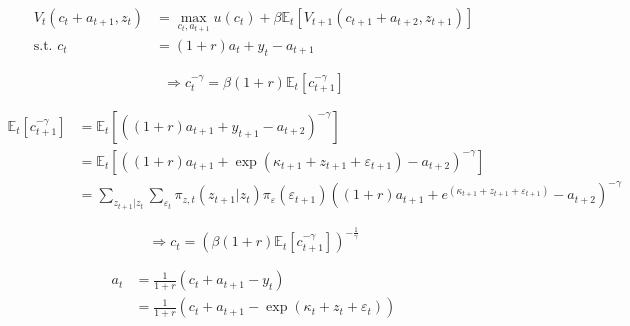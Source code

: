 \documentclass[11pt]{article}
\begin{document}
\begin{equation*}
\begin{split}
 V_{t}(c_t + a_{t+1}, z_t) &= \max_{c_t,a_{t+1}} u(c_{t}) + \beta \mathbb{E}_t[V_{t+1}(c_{t+1} + a_{t+2}, z_{t+1})] \\
 \text{s.t. } c_t &= (1+r) a_{t}+y_t - a_{t+1}
\end{split}
\end{equation*}

$$ \Rightarrow c_t^{-\gamma} = \beta (1+r) \mathbb{E}_t [c_{t+1}^{-\gamma}] $$

\begin{equation}
\begin{split}
\mathbb{E}_t [c_{t+1}^{-\gamma}] &=
      \mathbb{E}_t [\left( (1+r)a_{t+1} + y_{t+1} - a_{t+2} \right)^{-\gamma}] \\
      &= \mathbb{E}_t [\left((1+r)a_{t+1} + \exp(\kappa_{t+1} + z_{t+1} + \varepsilon_{t+1}) - a_{t+2} \right)^{-\gamma}] \\
      &= \sum_{z_{t+1}|z_t} \sum_{\varepsilon_t} \pi_{z,t}(z_{t+1}|z_t) \pi_\varepsilon(\varepsilon_{t+1}) \left((1+r)a_{t+1} + e^{(\kappa_{t+1} + z_{t+1} + \varepsilon_{t+1})} - a_{t+2} \right)^{-\gamma}
\end{split}
\end{equation}

\begin{equation}
  \Rightarrow c_t = \left( \beta (1+r) \mathbb{E}_t [c_{t+1}^{-\gamma}]  \right) ^{-\frac{1}{\gamma}}
\end{equation}

\begin{equation}
\begin{split}
a_{t} &= \frac{1}{1+r} \left( c_t + a_{t+1} - y_t \right) \\
      &= \frac{1}{1+r} \left( c_t + a_{t+1} - \exp( \kappa_t + z_{t} + \varepsilon_{t}) \right)
\end{split}
\end{equation}


\end{document}

